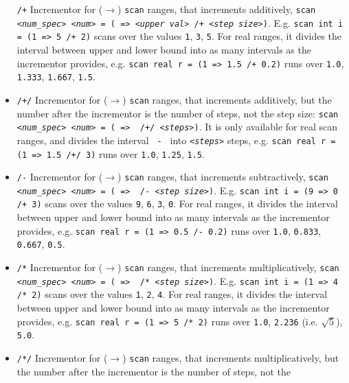 \documentclass[12pt]{book}
\newcommand{\ttt}[1]{\texttt{#1}}
\begin{document}
\begin{itemize}
\ttt{/+} \newline
Incrementor for ($\to$) \ttt{scan} ranges, that increments additively,
\ttt{scan {\em <num\_spec> <num>} = ({\em <lower val>} => {\em <upper
    val>} /+ {\em <step
size>})}. E.g. \ttt{scan int i = (1 => 5 /+ 2)} scans over the values \ttt{1},
\ttt{3}, \ttt{5}. For real ranges, it divides the interval between
upper and lower bound into as many intervals as the incrementor
provides, e.g. \ttt{scan real r = (1 => 1.5 /+ 0.2)} runs over
\ttt{1.0}, \ttt{1.333}, \ttt{1.667}, \ttt{1.5}.
\item
\ttt{/+/} \newline
Incrementor for ($\to$) \ttt{scan} ranges, that increments additively,
but the number after the incrementor is the number of steps, not the
step size: \ttt{scan {\em <num\_spec> <num>} = ({\em <lower val>} =>
  {\em <upper val>}
/+/ {\em <steps>})}. It is only available for real scan ranges, and divides
the interval \ttt{{\em <upper val>} - {\em <lower val>}} into
\ttt{{\em <steps>}} steps,
e.g. \ttt{scan real r = (1 => 1.5 /+/ 3)} runs over \ttt{1.0},
\ttt{1.25}, \ttt{1.5}.
\item
\ttt{/-} \newline
Incrementor for ($\to$) \ttt{scan} ranges, that increments subtractively,
\ttt{scan {\em <num\_spec>} {\em <num>} = ({\em <lower val>} => {\em <upper val>} /- {\em <step
size>})}. E.g. \ttt{scan int i = (9 => 0 /+ 3)} scans over the values \ttt{9},
\ttt{6}, \ttt{3}, \ttt{0}. For real ranges, it divides the interval
between upper and lower bound into as many intervals as the incrementor
provides, e.g. \ttt{scan real r = (1 => 0.5 /- 0.2)} runs over
\ttt{1.0}, \ttt{0.833}, \ttt{0.667}, \ttt{0.5}.
\item
\ttt{/*} \newline
Incrementor for ($\to$) \ttt{scan} ranges, that increments multiplicatively,
\ttt{scan {\em <num\_spec>} {\em <num>} = ({\em <lower val>} => {\em <upper val>} /* {\em <step
size>})}. E.g. \ttt{scan int i = (1 => 4 /* 2)} scans over the values \ttt{1},
\ttt{2}, \ttt{4}. For real ranges, it divides the interval
between upper and lower bound into as many intervals as the incrementor
provides, e.g. \ttt{scan real r = (1 => 5 /* 2)} runs over
\ttt{1.0}, \ttt{2.236} (i.e. $\sqrt{5}$), \ttt{5.0}.
\item
\ttt{/*/} \newline
Incrementor for ($\to$) \ttt{scan} ranges, that increments multiplicatively,
but the number after the incrementor is the number of steps, not the

\end{itemize}
\end{document}
